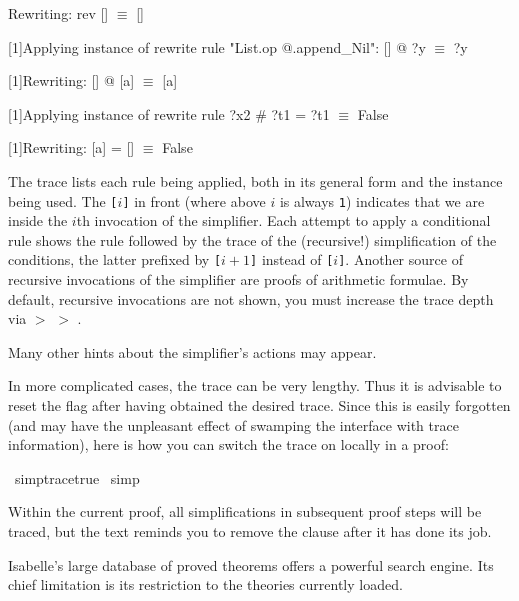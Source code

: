 \begin{isabellebody}
\begin{isamarkuptext}
\begin{ttbox}
[1]Rewriting:
rev [] \(\equiv\) []

[1]Applying instance of rewrite rule "List.op @.append_Nil":
[] @ ?y \(\equiv\) ?y

[1]Rewriting:
[] @ [a] \(\equiv\) [a]

[1]Applying instance of rewrite rule
?x2 # ?t1 = ?t1 \(\equiv\) False

[1]Rewriting:
[a] = [] \(\equiv\) False
\end{ttbox}
The trace lists each rule being applied, both in its general form and
the instance being used. The \texttt{[}$i$\texttt{]} in front (where
above $i$ is always \texttt{1}) indicates that we are inside the $i$th
invocation of the simplifier. Each attempt to apply a
conditional rule shows the rule followed by the trace of the
(recursive!) simplification of the conditions, the latter prefixed by
\texttt{[}$i+1$\texttt{]} instead of \texttt{[}$i$\texttt{]}.
Another source of recursive invocations of the simplifier are
proofs of arithmetic formulae. By default, recursive invocations are not shown,
you must increase the trace depth via  $>$  $>$ .

Many other hints about the simplifier's actions may appear.

In more complicated cases, the trace can be very lengthy.  Thus it is
advisable to reset the  flag after having
obtained the desired trace.
Since this is easily forgotten (and may have the unpleasant effect of
swamping the interface with trace information), here is how you can switch
the trace on locally in a proof:%
\end{isamarkuptext}%
\isamarkuptrue%
%
\isadelimproof
%
\endisadelimproof
%
\isatagproof
{}\isamarkupfalse%
\ {}{}simp{}trace{}true{}{}\isanewline
{}\isamarkupfalse%
\ simp%
\endisatagproof
{\isafoldproof}%
%
\isadelimproof
%
\endisadelimproof
%
\begin{isamarkuptext}%
\noindent
Within the current proof, all simplifications in subsequent proof steps
will be traced, but the text reminds you to remove the  clause
after it has done its job.%
\end{isamarkuptext}%
\isamarkuptrue%
%
\isamarkuptrue%
%
\begin{isamarkuptext}%
Isabelle's large database of proved theorems 
offers a powerful search engine. Its chief limitation is
its restriction to the theories currently loaded.


\end{isamarkuptext}
\end{isabellebody}
